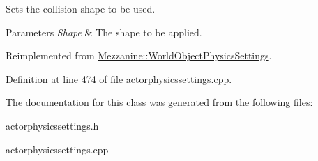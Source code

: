 Sets the collision shape to be used. 


\begin{DoxyParams}{Parameters}
{\em Shape} & The shape to be applied. \\
\hline
\end{DoxyParams}


Reimplemented from \hyperlink{classMezzanine_1_1WorldObjectPhysicsSettings_ae8b786e26eed334b283156b442807039}{Mezzanine::WorldObjectPhysicsSettings}.



Definition at line 474 of file actorphysicssettings.cpp.



The documentation for this class was generated from the following files:\begin{DoxyCompactItemize}
\item 
actorphysicssettings.h\item 
actorphysicssettings.cpp\end{DoxyCompactItemize}

